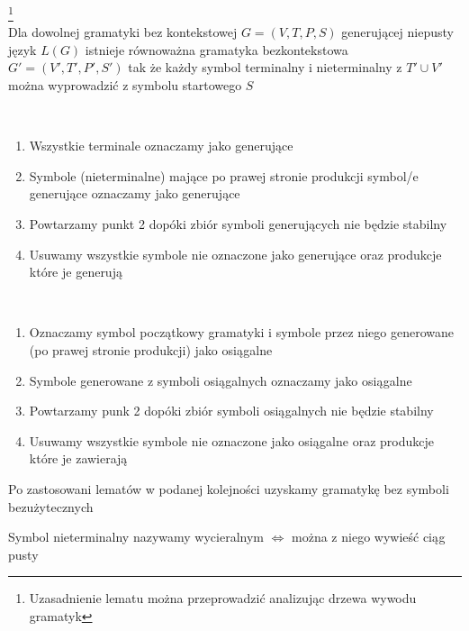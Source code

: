 	\begin{lemat}\footnote{Uzasadnienie lematu można przeprowadzić analizując drzewa wywodu gramatyk}~\\
		Dla dowolnej gramatyki bez kontekstowej $G = (V, T, P, S)$ generującej niepusty język $L(G)$ istnieje równoważna gramatyka
		bezkontekstowa $G' = (V', T', P', S')$ tak że każdy symbol terminalny i nieterminalny z $T' \cup V'$ można wyprowadzić
		z  symbolu startowego $S$
	\end{lemat}		
	
	\begin{alg}~\\
		\begin{enumerate}
			\item Wszystkie terminale oznaczamy jako generujące
			\item Symbole (nieterminalne) mające po prawej stronie produkcji symbol/e generujące oznaczamy jako generujące
			\item Powtarzamy punkt 2 dopóki zbiór symboli generujących nie będzie stabilny
			\item Usuwamy wszystkie symbole nie oznaczone jako generujące oraz produkcje które je generują
		\end{enumerate}
	\end{alg}
	
	\begin{alg}~\\
		\begin{enumerate}
			\item Oznaczamy symbol początkowy gramatyki i symbole przez niego generowane (po prawej stronie produkcji)
			jako osiągalne
			\item Symbole generowane z symboli osiągalnych oznaczamy jako osiągalne
			\item Powtarzamy punk 2 dopóki zbiór symboli osiągalnych nie będzie stabilny
			\item Usuwamy wszystkie symbole nie oznaczone jako osiągalne oraz produkcje które je zawierają
		\end{enumerate}
	\end{alg}	
	
	\begin{tw}
		Po zastosowani lematów w podanej kolejności uzyskamy gramatykę bez symboli bezużytecznych
	\end{tw}
	
	\begin{df}
		Symbol nieterminalny nazywamy wycieralnym $\Leftrightarrow$ można z niego wywieść ciąg pusty
	\end{df}		

